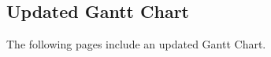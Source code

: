 \documentclass[12pt, titlepage]{article}
\begin{document}
\subsection{Updated Gantt Chart}
\label{gantt}
The following pages include an updated Gantt Chart.

\end{document}
